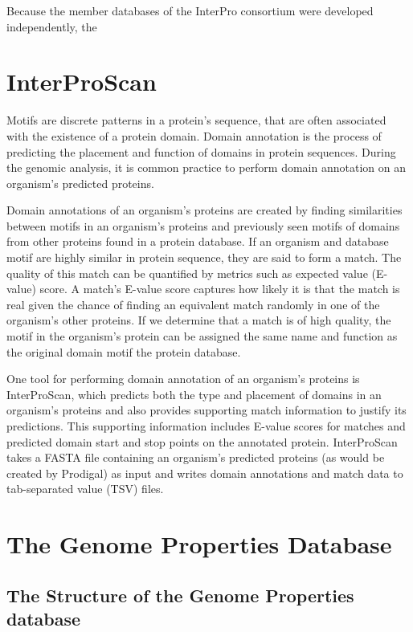 Because the member databases of the InterPro consortium were developed independently, the 

\section{InterProScan}

Motifs are discrete patterns in a protein's sequence, that are often associated with the existence of a protein domain. Domain annotation is the process of predicting the placement and function of domains in protein sequences. During the genomic analysis, it is common practice to perform domain annotation on an organism's predicted proteins.

Domain annotations of an organism's proteins are created by finding similarities between motifs in an organism's proteins and previously seen motifs of domains from other proteins found in a protein database. If an organism and database motif are highly similar in protein sequence, they are said to form a match. The quality of this match can be quantified by metrics such as expected value (E-value) score. A match's E-value score captures how likely it is that the match is real given the chance of finding an equivalent match randomly in one of the organism's other proteins. If we determine that a match is of high quality, the motif in the organism's protein can be assigned the same name and function as the original domain motif the protein database.

One tool for performing domain annotation of an organism's proteins is InterProScan, which predicts both the type and placement of domains in an organism's proteins and also provides supporting match information to justify its predictions. This supporting information includes E-value scores for matches and predicted domain start and stop points on the annotated protein. InterProScan takes a FASTA file \cite{pearson19905} containing an organism's predicted proteins (as would be created by Prodigal) as input and writes domain annotations and match data to tab-separated value (TSV) files.

\section{The Genome Properties Database}

\subsection{The Structure of the Genome Properties database}


